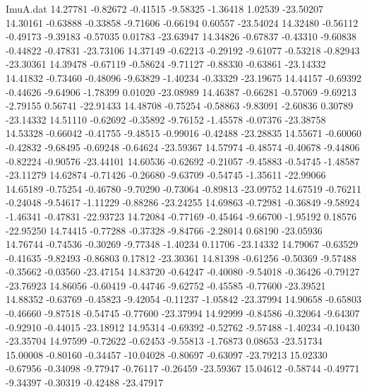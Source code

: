 \begin{filecontents}{ImuA.dat}
  14.27781   -0.82672   -0.41515   -9.58325   -1.36418    1.02539  -23.50207
  14.30161   -0.63888   -0.33858   -9.71606   -0.66194    0.60557  -23.54024
  14.32480   -0.56112   -0.49173   -9.39183   -0.57035    0.01783  -23.63947
  14.34826   -0.67837   -0.43310   -9.60838   -0.44822   -0.47831  -23.73106
  14.37149   -0.62213   -0.29192   -9.61077   -0.53218   -0.82943  -23.30361
  14.39478   -0.67119   -0.58624   -9.71127   -0.88330   -0.63861  -23.14332
  14.41832   -0.73460   -0.48096   -9.63829   -1.40234   -0.33329  -23.19675
  14.44157   -0.69392   -0.44626   -9.64906   -1.78399    0.01020  -23.08989
  14.46387   -0.66281   -0.57069   -9.69213   -2.79155    0.56741  -22.91433
  14.48708   -0.75254   -0.58863   -9.83091   -2.60836    0.30789  -23.14332
  14.51110   -0.62692   -0.35892   -9.76152   -1.45578   -0.07376  -23.38758
  14.53328   -0.66042   -0.41755   -9.48515   -0.99016   -0.42488  -23.28835
  14.55671   -0.60060   -0.42832   -9.68495   -0.69248   -0.64624  -23.59367
  14.57974   -0.48574   -0.40678   -9.44806   -0.82224   -0.90576  -23.44101
  14.60536   -0.62692   -0.21057   -9.45883   -0.54745   -1.48587  -23.11279
  14.62874   -0.71426   -0.26680   -9.63709   -0.54745   -1.35611  -22.99066
  14.65189   -0.75254   -0.46780   -9.70290   -0.73064   -0.89813  -23.09752
  14.67519   -0.76211   -0.24048   -9.54617   -1.11229   -0.88286  -23.24255
  14.69863   -0.72981   -0.36849   -9.58924   -1.46341   -0.47831  -22.93723
  14.72084   -0.77169   -0.45464   -9.66700   -1.95192    0.18576  -22.95250
  14.74415   -0.77288   -0.37328   -9.84766   -2.28014    0.68190  -23.05936
  14.76744   -0.74536   -0.30269   -9.77348   -1.40234    0.11706  -23.14332
  14.79067   -0.63529   -0.41635   -9.82493   -0.86803    0.17812  -23.30361
  14.81398   -0.61256   -0.50369   -9.57488   -0.35662   -0.03560  -23.47154
  14.83720   -0.64247   -0.40080   -9.54018   -0.36426   -0.79127  -23.76923
  14.86056   -0.60419   -0.44746   -9.62752   -0.45585   -0.77600  -23.39521
  14.88352   -0.63769   -0.45823   -9.42054   -0.11237   -1.05842  -23.37994
  14.90658   -0.65803   -0.46660   -9.87518   -0.54745   -0.77600  -23.37994
  14.92999   -0.84586   -0.32064   -9.64307   -0.92910   -0.44015  -23.18912
  14.95314   -0.69392   -0.52762   -9.57488   -1.40234   -0.10430  -23.35704
  14.97599   -0.72622   -0.62453   -9.55813   -1.76873    0.08653  -23.51734
  15.00008   -0.80160   -0.34457  -10.04028   -0.80697   -0.63097  -23.79213
  15.02330   -0.67956   -0.34098   -9.77947   -0.76117   -0.26459  -23.59367
  15.04612   -0.58744   -0.49771   -9.34397   -0.30319   -0.42488  -23.47917

\end{filecontents}

